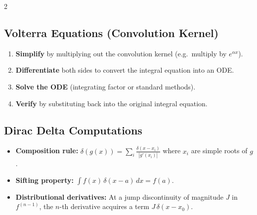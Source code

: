 \documentclass[a4paper,9pt]{article}
\begin{document}
\begin{multicols}{2}
\subsection{Volterra Equations (Convolution Kernel)}
\begin{enumerate}
\item \textbf{Simplify} by multiplying out the convolution kernel (e.g.\ multiply by $e^{\alpha x}$).
\item \textbf{Differentiate} both sides to convert the integral equation into an ODE.
\item \textbf{Solve the ODE} (integrating factor or standard methods).
\item \textbf{Verify} by substituting back into the original integral equation.
\end{enumerate}

\subsection{Dirac Delta Computations}
\begin{itemize}
\item \textbf{Composition rule:} $\delta(g(x))=\sum_i \frac{\delta(x-x_i)}{|g'(x_i)|}$ where $x_i$ are simple roots of $g$.
\item \textbf{Sifting property:} $\int f(x)\,\delta(x-a)\,dx = f(a)$.
\item \textbf{Distributional derivatives:} At a jump discontinuity of magnitude $J$ in $f^{(n-1)}$, the $n$-th derivative acquires a term $J\,\delta(x-x_0)$.
\end{itemize}

\end{multicols}
\end{document}
